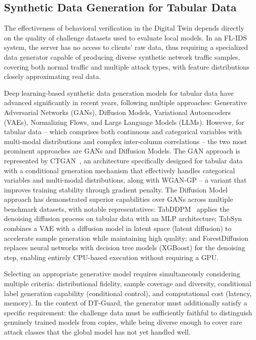 \documentclass[runningheads]{llncs}
\begin{document}
\subsection{Synthetic Data Generation for Tabular Data}

The effectiveness of behavioral verification in the Digital Twin depends directly on the quality of challenge datasets used to evaluate local models. In an FL-IDS system, the server has no access to clients' raw data, thus requiring a specialized data generator capable of producing diverse synthetic network traffic samples, covering both normal traffic and multiple attack types, with feature distributions closely approximating real data.

Deep learning-based synthetic data generation models for tabular data have advanced significantly in recent years, following multiple approaches: Generative Adversarial Networks (GANs), Diffusion Models, Variational Autoencoders (VAEs), Normalizing Flows, and Large Language Models (LLMs). However, for tabular data -- which comprises both continuous and categorical variables with multi-modal distributions and complex inter-column correlations -- the two most prominent approaches are GANs and Diffusion Models. The GAN approach is represented by CTGAN~\cite{xu2019modeling}, an architecture specifically designed for tabular data with a conditional generation mechanism that effectively handles categorical variables and multi-modal distributions, along with WGAN-GP -- a variant that improves training stability through gradient penalty. The Diffusion Model approach has demonstrated superior capabilities over GANs across multiple benchmark datasets, with notable representatives: TabDDPM~\cite{kotelnikov2023tabddpm} applies the denoising diffusion process on tabular data with an MLP architecture; TabSyn combines a VAE with a diffusion model in latent space (latent diffusion) to accelerate sample generation while maintaining high quality; and ForestDiffusion replaces neural networks with decision tree models (XGBoost) for the denoising step, enabling entirely CPU-based execution without requiring a GPU.

Selecting an appropriate generative model requires simultaneously considering multiple criteria: distributional fidelity, sample coverage and diversity, conditional label generation capability (conditional control), and computational cost (latency, memory). In the context of DT-Guard, the generator must additionally satisfy a specific requirement: the challenge data must be sufficiently faithful to distinguish genuinely trained models from copies, while being diverse enough to cover rare attack classes that the global model has not yet handled well.
\end{document}
